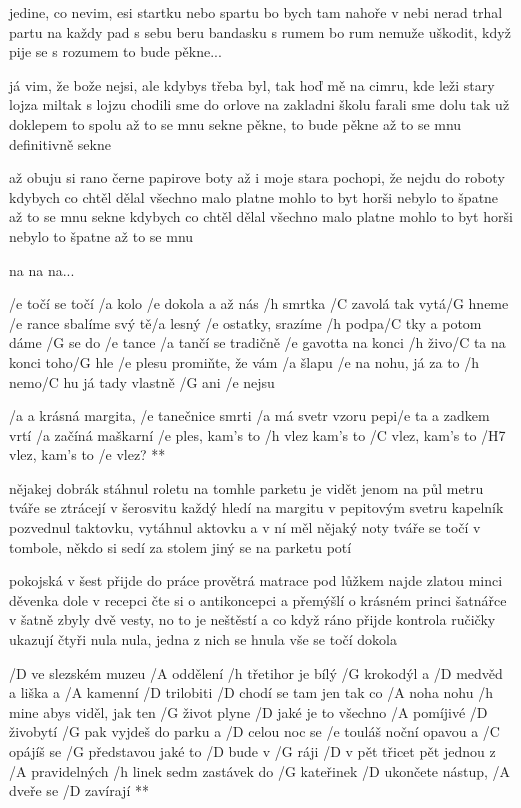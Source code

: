 jedine, co nevim, esi startku nebo spartu
bo bych tam nahoře v nebi nerad trhal partu
na každy pad s sebu beru bandasku s rumem
bo rum nemuže uškodit, když pije se s rozumem
to bude pěkne... \s

já vim, že bože nejsi, ale kdybys třeba byl, tak
hoď mě na cimru, kde leži stary lojza miltak
s lojzu chodili sme do orlove na zakladni školu
farali sme dolu tak už doklepem to spolu
až to se mnu sekne
pěkne, to bude pěkne
až to se mnu definitivně sekne \s

až obuju si rano černe papirove boty
až i moje stara pochopi, že nejdu do roboty
kdybych co chtěl dělal všechno malo platne
mohlo to byt horši nebylo to špatne
až to se mnu sekne
kdybych co chtěl dělal všechno malo platne
mohlo to byt horši nebylo to špatne
až to se mnu \s

na na na...




/e točí se točí /a kolo /e dokola a až nás /h smrtka /C zavolá
tak vytá/G hneme /e rance
sbalíme svý tě/a lesný /e ostatky, srazíme /h podpa/C tky
a potom dáme /G se do /e tance
/a tančí se tradičně /e gavotta na konci /h živo/C ta
na konci toho/G hle /e plesu
promiňte, že vám /a šlapu /e na nohu, já za to /h nemo/C hu
já tady vlastně /G ani /e nejsu

\R /a a krásná margita, /e tanečnice smrti
   /a má svetr vzoru pepi/e ta a zadkem vrtí
   /a začíná maškarní /e ples, kam's to /h vlez
   kam's to /C vlez, kam's to /H7 vlez, kam's to /e vlez? **

nějakej dobrák stáhnul roletu na tomhle parketu
je vidět jenom na půl metru
tváře se ztrácejí v šerosvitu každý hledí na margitu
v pepitovým svetru
kapelník pozvednul taktovku, vytáhnul aktovku
a v ní měl nějaký noty
tváře se točí v tombole, někdo si sedí za stolem
jiný se na parketu potí \s

pokojská v šest přijde do práce provětrá matrace
pod lůžkem najde zlatou minci
děvenka dole v recepci čte si o antikoncepci
a přemýšlí o krásném princi
šatnářce v šatně zbyly dvě vesty, no to je neštěstí
a co když ráno přijde kontrola
ručičky ukazují čtyři nula nula, jedna z nich se hnula
vše se točí dokola




/D ve slezském muzeu /A oddělení
/h třetihor je bílý /G krokodýl a
/D medvěd a liška a /A kamenní /D trilobiti
/D chodí se tam jen tak co /A noha nohu
/h mine abys viděl, jak ten /G život plyne
/D jaké je to všechno /A pomíjivé /D živobytí
/G pak vyjdeš do parku a /D celou noc se
/e touláš noční opavou a /C opájíš se
/G představou jaké to /D bude v /G ráji
\R /D v pět třicet pět jednou z /A pravidelných
   /h linek sedm zastávek do /G kateřinek
   /D ukončete nástup, /A dveře se /D zavírají **

